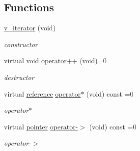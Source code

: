 \subsection*{Functions}
\begin{DoxyCompactItemize}
\item 
\mbox{\label{group___thin_var_dep_interface___c_l_a_s_s_e_s_ga9cd58d13e7890847374b00c665cda7e5}} 
\mbox{\hyperlink{group___thin_var_dep_interface___c_l_a_s_s_e_s_ga9cd58d13e7890847374b00c665cda7e5}{v\+\_\+iterator}} (void)
\begin{DoxyCompactList}\small\item\em constructor \end{DoxyCompactList}\item 
virtual void \mbox{\hyperlink{group___thin_var_dep_interface___c_l_a_s_s_e_s_ga79fc9d17094dc591d6b48bc296028d51}{operator++}} (void)=0
\begin{DoxyCompactList}\small\item\em destructor \end{DoxyCompactList}\item 
\mbox{\label{group___thin_var_dep_interface___c_l_a_s_s_e_s_gabce2a2d16159da29402d5561d6e0e28c}} 
virtual \mbox{\hyperlink{class_s_m_spp__di__unipi__it_1_1_variable}{reference}} \mbox{\hyperlink{group___thin_var_dep_interface___c_l_a_s_s_e_s_gabce2a2d16159da29402d5561d6e0e28c}{operator$\ast$}} (void) const =0
\begin{DoxyCompactList}\small\item\em operator$\ast$ \end{DoxyCompactList}\item 
\mbox{\label{group___thin_var_dep_interface___c_l_a_s_s_e_s_gab6b157ee55dad2dd8215f31aafbdd35f}} 
virtual \mbox{\hyperlink{class_s_m_spp__di__unipi__it_1_1_variable}{pointer}} \mbox{\hyperlink{group___thin_var_dep_interface___c_l_a_s_s_e_s_gab6b157ee55dad2dd8215f31aafbdd35f}{operator-\/$>$}} (void) const =0
\begin{DoxyCompactList}\small\item\em operator-\/$>$ \end{DoxyCompactList}\item 
\mbox{\label{group___thin_var_dep_interface___c_l_a_s_s_e_s_ga165c06b6e2a096f5e53417077791cacb}} 

\end{DoxyCompactItemize}
